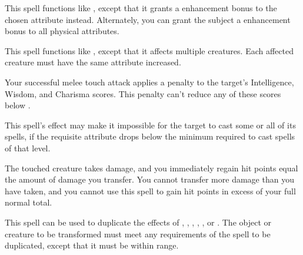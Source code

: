 \begin{spelleffect}
    This spell functions like , except that it grants a  enhancement bonus to the chosen attribute instead. Alternately, you can grant the subject a  enhancement bonus to all physical attributes.
\end{spelleffect}

\spellrng{\rngmed}
\begin{spelleffect}
  This spell functions like , except that it affects multiple creatures. Each affected creature must have the same attribute increased. 
\end{spelleffect}

\spelldur{\durshort}
\begin{spelleffect}
   Your successful melee touch attack applies a  penalty to the target's Intelligence, Wisdom, and Charisma scores. This penalty can't reduce any of these scores below .
\end{spelleffect}
\begin{spellnotes}
  This spell's effect may make it impossible for the target to cast some or all of its spells, if the requisite attribute drops below the minimum required to cast spells of that level.
\end{spellnotes}

\begin{spelleffect}
  The touched creature takes damage, and you immediately regain hit points equal the amount of damage you transfer. You cannot transfer more damage than you have taken, and you cannot use this spell to gain hit points in excess of your full normal total.
\end{spelleffect}

\spellrng{\rngmed}
\begin{spelleffect}
  This spell can be used to duplicate the effects of , , , , , or . The object or creature to be transformed must meet any requirements of the spell to be duplicated, except that it must be within \rngmed range.
\end{spelleffect}

